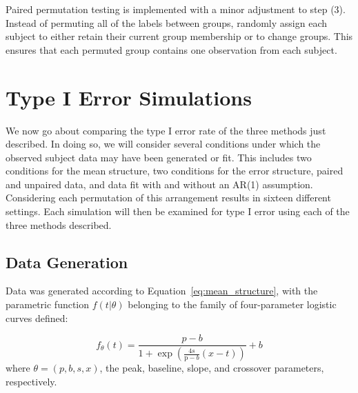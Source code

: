 \documentclass{article}
\begin{document}
Paired permutation testing is implemented with a minor adjustment to step (3). Instead of permuting all of the labels between groups, randomly assign each subject to either retain their current group membership or to change groups. This ensures that each permuted group contains one observation from each subject.



\section{Type I Error Simulations}

We now go about comparing the type I error rate of the three methods just described. In doing so, we will consider several conditions under which the observed subject data may have been generated or fit. This includes two conditions for the mean structure, two conditions for the error structure, paired and unpaired data, and data fit with and without an AR(1) assumption. Considering each permutation of this arrangement results in sixteen different settings. Each simulation will then be examined for type I error using each of the three methods described.



\subsection{Data Generation}

Data was generated according to Equation~\ref{eq:mean_structure}, with the parametric function $f(t|\theta)$ belonging to the family of four-parameter logistic curves defined:

\begin{equation}\label{eq:logistic}
f_{\theta}(t) = \frac{p-b}{1 + \exp \left(\frac{4s}{\text{p}-b} (x - t) \right)} + b
\end{equation}
where $\theta = (p, b, s, x)$, the peak, baseline, slope, and crossover parameters, respectively.
\end{document}
